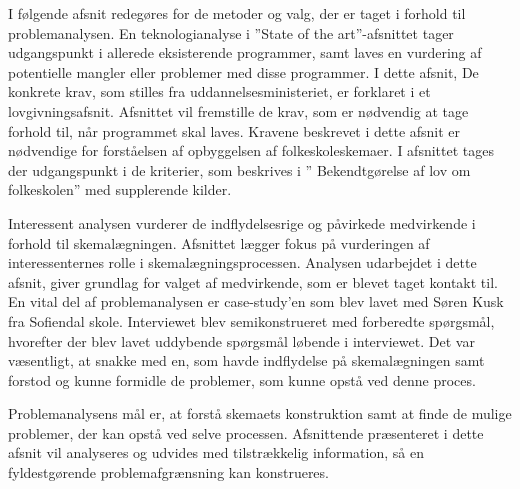 I følgende afsnit redegøres for de metoder og valg, der er taget i forhold til problemanalysen. En teknologianalyse i ”State of the art”-afsnittet tager udgangspunkt i allerede eksisterende programmer, samt laves en vurdering af potentielle mangler eller problemer med disse programmer. I dette afsnit,
De konkrete krav, som stilles fra uddannelsesministeriet, er forklaret i et lovgivningsafsnit. Afsnittet vil fremstille de krav, som er nødvendig at tage forhold til, når programmet skal laves. Kravene beskrevet i dette afsnit er nødvendige for forståelsen af opbyggelsen af folkeskoleskemaer. I afsnittet tages der udgangspunkt i de kriterier, som beskrives i ” Bekendtgørelse af lov om folkeskolen” med supplerende kilder.

Interessent analysen vurderer de indflydelsesrige og påvirkede medvirkende i forhold til skemalægningen. Afsnittet lægger fokus på vurderingen af interessenternes rolle i skemalægningsprocessen. Analysen udarbejdet i dette afsnit, giver grundlag for valget af medvirkende, som er blevet taget kontakt til.   
En vital del af problemanalysen er case-study’en som blev lavet med Søren Kusk fra Sofiendal skole. Interviewet blev semikonstrueret med forberedte spørgsmål, hvorefter der blev lavet uddybende spørgsmål løbende i interviewet. Det var væsentligt, at snakke med en, som havde indflydelse på skemalægningen samt forstod og kunne formidle de problemer, som kunne opstå ved denne proces.

Problemanalysens mål er, at forstå skemaets konstruktion samt at finde de mulige problemer, der kan opstå ved selve processen. Afsnittende præsenteret i dette afsnit vil analyseres og udvides med tilstrækkelig information, så en fyldestgørende problemafgrænsning kan konstrueres. 
